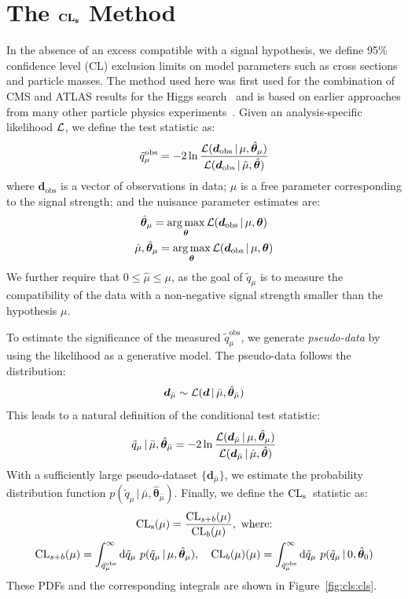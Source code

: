 \chapter{The $\mathbf{\text{{\bf CL}}_s}$ Method}
\label{sec:cls}

In the absence of an excess compatible with a signal hypothesis, we define 95\% confidence level (CL) exclusion limits on model parameters such as cross sections and particle masses.
The method used here was first used for the combination of CMS and ATLAS results for the Higgs search~\cite{cls1} and is based on earlier approaches from many other particle physics experiments~\cite{cls2,cls3}.
Given an analysis-specific likelihood $\mathcal{L}$, we define the test statistic as:
\begin{equation}
    \tilde q_\mu^\mathrm{obs} = -2\ln \frac{\mathcal{L}(\bm{d}_\mathrm{obs} \,|\, \mu,\hat{\bm{\theta}}_\mu)}{\mathcal{L}(\bm{d}_\mathrm{obs} \,|\, \hat\mu,\hat{\bm{\theta}})}
\end{equation}
where $\bm{d}_\mathrm{obs}$ is a vector of observations in data; $\mu$ is a free parameter corresponding to the signal strength; and the nuisance parameter estimates are:
\begin{gather}
    \hat{\bm{\theta}}_\mu = \operatorname*{arg\,max}_{\bm{\theta}} \mathcal{L}(\bm{d}_\mathrm{obs}\,|\,\mu,\bm{\theta}) \nonumber \\
    \hat\mu, \hat{\bm{\theta}}_\mu = \operatorname*{arg\,max}_{\bm{\theta}} \mathcal{L}(\bm{d}_\mathrm{obs}\,|\,\mu,\bm{\theta}) 
\end{gather}
We further require that $0 \leq \hat\mu \leq \mu$, as the goal of $\tilde q _\mu$ is to measure the compatibility of the data with a non-negative signal strength smaller than the hypothesis $\mu$.

To estimate the significance of the measured $\tilde q^\mathrm{obs}_\mu$, we generate \emph{pseudo-data} by using the likelihood as a generative model.
The pseudo-data follows the distribution:
\begin{equation}
    \bm{d}_{\bar\mu} \sim \mathcal{L}(\bm d\,|\,\bar\mu, \hat{\bm{\theta}}_{\bar\mu})
\end{equation}
This leads to a natural definition of the conditional test statistic:
\begin{equation}
    \tilde q_{\mu}\,|\,{\bar\mu},\hat{\bm\theta}_{\bar\mu} = -2\ln \frac{\mathcal{L}(\bm{d}_{\bar\mu} \,|\, {\mu},\hat{\bm{\theta}}_{\mu})}{\mathcal{L}(\bm{d}_{\bar\mu} \,|\, \hat{\mu},\hat{\bm{\theta}})}
\end{equation}
With a sufficiently large pseudo-dataset $\{\bm{d}_{\bar\mu}\}$, we estimate the probability distribution function $p(\tilde q_{\mu}\,|\,{\bar\mu},\hat{\bm{\theta}}_{\bar\mu})$.
Finally, we define the $\operatorname{\mathrm{CL}_s}$~statistic as:
\begin{gather}
    \operatorname{\mathrm{CL}_s}(\mu) = \frac{\mathrm{CL}_{s+b}(\mu)}{\mathrm{CL}_b(\mu)},~\text{where:} \nonumber \\ 
    \mathrm{CL}_{s+b}(\mu) = \int_{\tilde q_\mu^\mathrm{obs}}^\infty \mathrm{d} \tilde q_{\mu}~p(\tilde q_\mu\,|\,\mu,\hat{\bm{\theta}}_\mu), \quad
    \mathrm{CL}_b(\mu)(\mu) = \int_{\tilde q_\mu^\mathrm{obs}}^\infty \mathrm{d} \tilde q_{\mu}~p(\tilde q_\mu\,|\,0,\hat{\bm{\theta}}_0)
\end{gather}
These PDFs and the corresponding integrals are shown in Figure~\ref{fig:cls:cls}.

